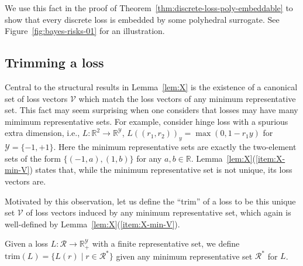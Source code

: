 \documentclass[twoside,11pt]{article}
\newcommand{\Comments}{1}
\newcommand{\mynote}[2]{\ifnum\Comments=1\textcolor{#1}{#2}\fi}
\newcommand{\mytodo}[2]{\ifnum\Comments=1%
  \todo[linecolor=#1!80!black,backgroundcolor=#1,bordercolor=#1!80!black]{#2}\fi}
\newcommand{\jessie}[1]{\mynote{teal}{[JF: #1]}}
\newcommand{\btw}[1]{\mytodo{gray!20!white}{BTW: #1}}%
\newcommand{\reals}{\mathbb{R}}
\newcommand{\R}{\mathcal{R}}
\newcommand{\V}{\mathcal{V}}
\newcommand{\Y}{\mathcal{Y}}
\newcommand{\trimcover}{\mathrm{trim}}
\DeclareMathOperator*{\sgn}{sgn}
\begin{document}
We use this fact in the proof of Theorem~\ref{thm:discrete-loss-poly-embeddable} to show that every discrete loss is embedded by some polyhedral surrogate.
See Figure~\ref{fig:bayes-risks-01} for an illustration.





\subsection{Trimming a loss}
\label{sec:trim}

Central to the structural results in Lemma~\ref{lem:X} is the existence of a canonical set of loss vectors $\V$ which match the loss vectors of any minimum representative set.
This fact may seem surprising when one considers that losses may have many mimimum representative sets.
For example, consider hinge loss with a spurious extra dimension, i.e., $L:\reals^2\to\reals^\Y$, $L((r_1, r_2))_y = \max(0,1-r_1y)$ for $\Y = \{-1,+1\}$.
Here the minimum representative sets are exactly the two-element sets of the form $\{(-1,a),(1,b)\}$ for any $a,b\in\reals$. 
Lemma~\ref{lem:X}(\ref{item:X-min-V}) states that, while the minimum representative set is not unique, its loss vectors are.

Motivated by this observation, let us define the ``trim'' of a loss to be this unique set $\V$ of loss vectors induced by any minimum representative set, which again is well-defined by Lemma~\ref{lem:X}(\ref{item:X-min-V}).
\begin{definition}[Trim]\label{def:trim-loss}
  Given a loss $L:\R \to \reals_+^\Y$ with a finite representative set, we define $\trimcover(L) = \{L(r) \mid r \in \R^*\}$ given any minimum representative set $\R^*$ for $L$.
\end{definition}
\end{document}
